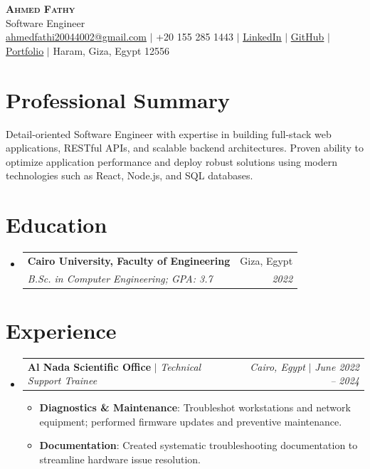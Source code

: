 \documentclass[letterpaper,10pt]{article}
\makeatletter
\newcommand{\resumeItem}[2]{\item\footnotesize{\textbf{#1}{: #2 \vspace{-2pt}}}}
\newcommand{\resumeSubheading}[4]{
  \vspace{-1pt}\item
    \begin{tabular*}{0.97\textwidth}{l@{\extracolsep{\fill}}r}
      \textbf{#1} & #2 \\
      \textit{\footnotesize#3} & \textit{\footnotesize #4} \\
    \end{tabular*}\vspace{-4pt}
}
\newcommand{\resumeActivitySubheading}[4]{
  \vspace{-1pt}\item
    \begin{tabular*}{0.97\textwidth}{l@{\extracolsep{\fill}}r}
      \textbf{#1} $|$ \textit{\footnotesize#3} & \textit{\footnotesize#2} $|$ \textit{\footnotesize #4} \\
    \end{tabular*}\vspace{-4pt}
}
\newcommand{\resumeSubHeadingListStart}{\begin{itemize}[leftmargin=*]}
\newcommand{\resumeSubHeadingListEnd}{\end{itemize}}
\newcommand{\resumeItemListStart}{\begin{itemize}}
\newcommand{\resumeItemListEnd}{\end{itemize}\vspace{-5pt}}
\newcommand{\resumeHeaderName}[1]{\LARGE \scshape #1}
\newcommand{\resumeHeaderMeta}[1]{\footnotesize #1}
\makeatother
\begin{document}
\begin{center}
    \textbf{\resumeHeaderName{Ahmed Fathy}} \\ \vspace{0pt}
    \resumeHeaderMeta{Software Engineer} \\
    \href{mailto:ahmedfathi20044002@gmail.com}{\underline{ahmedfathi20044002@gmail.com}} $|$
    +20 155 285 1443 $|$
    \href{https://www.linkedin.com/in/ahmedfathy-x1}{\underline{LinkedIn}} $|$
    \href{https://github.com/ahmedfathy0-0}{\underline{GitHub}} $|$
    \href{https://www.mrfathi.tech/}{\underline{Portfolio}} $|$
    Haram, Giza, Egypt 12556
\end{center}


\section{Professional Summary}
  \footnotesize Detail-oriented Software Engineer with expertise in building full-stack web applications, RESTful APIs, and scalable backend architectures. Proven ability to optimize application performance and deploy robust solutions using modern technologies such as React, Node.js, and SQL databases.
  \vspace{3pt}
\section{Education}
  \resumeSubHeadingListStart
    \resumeSubheading
      {Cairo University, Faculty of Engineering}{Giza, Egypt}
      {B.Sc. in Computer Engineering;  GPA: 3.7}{2022}
  \resumeSubHeadingListEnd
\section{Experience}
  \resumeSubHeadingListStart
    \resumeActivitySubheading
      {Al Nada Scientific Office}{Cairo, Egypt}{Technical Support Trainee}{June 2022 -- 2024}
      \resumeItemListStart
        \resumeItem{Diagnostics \& Maintenance}
          {Troubleshot workstations and network equipment; performed firmware updates and preventive maintenance.}
        \resumeItem{Documentation}
          {Created systematic troubleshooting documentation to streamline hardware issue resolution.}
      \resumeItemListEnd
  \resumeSubHeadingListEnd
\end{document}
